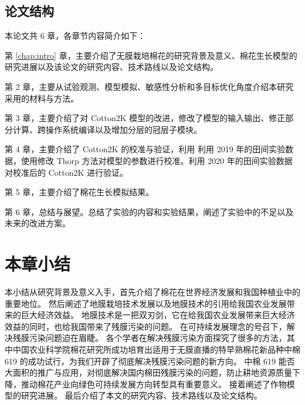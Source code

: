 \subsection{论文结构}
本论文共 6 章，各章节内容简介如下：

第 \ref{chap:intro} 章，主要介绍了无膜栽培棉花的研究背景及意义、棉花生长模型的研究进展以及该论文的研究内容、技术路线以及论文结构。

第 2 章，主要从试验观测、模型模拟、敏感性分析和多目标优化角度介绍本研究采用的材料与方法。

第 3 章，主要介绍了对 Cotton2K 模型的改进，修改了模型的输入输出、修正部分计算、跨操作系统编译以及增加分层的冠层子模块。

第 4 章，主要介绍了 Cotton2K 的校准与验证，利用 利用 2019 年的田间实验数据，使用修改 Thorp 方法对模型的参数进行校准。利用 2020 年的田间实验数据对校准后的 Cotton2K 进行验证。

第 5 章，主要介绍了棉花生长模拟结果。

第 6 章，总结与展望。总结了实验的内容和实验结果，阐述了实验中的不足以及未来的改进方案。

\section{本章小结}
本小结从研究背景及意义入手，首先介绍了棉花在世界经济发展和我国种植业中的重要地位。%
然后阐述了地膜栽培技术发展以及地膜技术的引用给我国农业发展带来的巨大经济效益。%
地膜技术是一把双刃剑，它在给我国农业发展带来巨大经济效益的同时，也给我国带来了残膜污染的问题。%
在可持续发展理念的号召下，解决残膜污染问题迫在眉睫。%
各个学者在解决残膜污染方面探究了很多的方法，其中中国农业科学院棉花研究所成功培育出适用于无膜直播的特早熟棉花新品种中棉 619 的成功试行，为我们开辟了彻底解决残膜污染问题的新方向。%
中棉 619 能否大面积的推广与应用，对彻底解决国内棉田残膜污染的问题，防止耕地资源质量下降，推动棉花产业向绿色可持续发展方向转型具有重要意义。%
接着阐述了作物模型的研究进展。%
最后介绍了本文的研究内容、技术路线以及论文结构。
